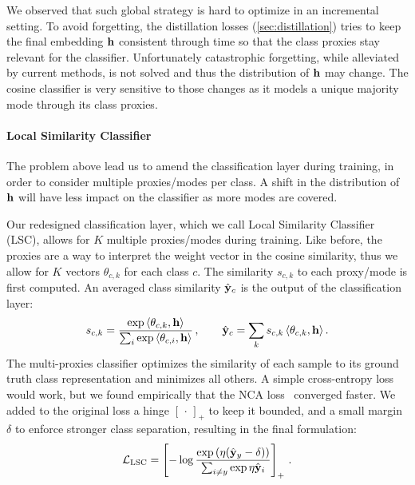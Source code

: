 We observed that such global strategy is hard to optimize in an incremental setting. To avoid
forgetting, the distillation losses (\autoref{sec:distillation}) tries to keep the final embedding
$\mathbf{h}$ consistent through time so that the class proxies stay relevant for the classifier.
Unfortunately catastrophic forgetting, while alleviated by current methods, is not solved and thus
the distribution of $\mathbf{h}$ may change. The cosine classifier is very sensitive to those changes as it
models a unique majority mode through its class proxies.


\paragraph{Local Similarity Classifier} The problem above lead us to amend the classification layer
during training, in order to consider multiple proxies/modes per class. A shift in the distribution
of $\mathbf{h}$ will have less impact on the classifier as more modes are covered.


Our redesigned classification layer, which we call Local Similarity Classifier (LSC), allows for $K$
multiple proxies/modes during training. Like before, the proxies are a way to interpret the weight
vector in the cosine similarity, thus we allow for $K$ vectors $\theta_{c,k}$ for each class $c$.
The similarity $s_{c,k}$ to each proxy/mode is first computed. An averaged class similarity $\hat{\mathbf{y}}_c$
is the output of the classification layer:
%
\begin{equation}
    s_{c,k} =\frac{\exp\,\langle\theta_{c,k},\mathbf{h}\rangle}{\sum_{i} \exp\,\langle\theta_{c,i},\mathbf{h}\rangle}\,, \qquad
    \hat{\mathbf{y}}_c = \sum_{k}s_{c,k}\,\langle\theta_{c,k},\mathbf{h}\rangle\,.
\end{equation}
%
The multi-proxies classifier optimizes the similarity of each sample to its ground truth class
representation and minimizes all others. A simple cross-entropy loss would work, but we found
empirically that the NCA loss~\citep{goldberger2005nca_loss,attias2017proxynca} converged faster. We
added to the original loss a hinge $[\,\cdot\,]_+$ to keep it bounded, and a small margin $\delta$
to enforce stronger class separation, resulting in the final formulation:
%
\begin{equation}
    \mathcal{L}_\text{LSC} = \left[- \log\frac{\exp\left(\eta (\hat{\mathbf{y}}_y - \delta)\right)}{\sum_{i \neq y} \exp \eta \hat{\mathbf{y}}_{i}} \right]_+ \,.
\end{equation}

